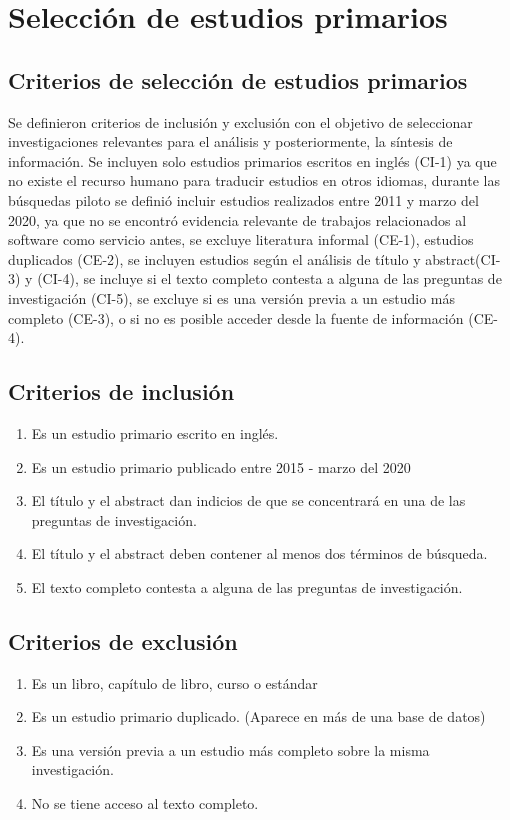 \documentclass{article}
\begin{document}
\section{Selección de estudios primarios}



\subsection{Criterios de selección de estudios primarios}
Se definieron criterios de inclusión y exclusión con el objetivo 
de seleccionar investigaciones relevantes para el análisis y posteriormente, 
la síntesis de información.
Se incluyen solo estudios primarios escritos en inglés (CI-1) ya que no existe el
recurso humano para traducir estudios en otros idiomas, durante las búsquedas piloto 
se definió incluir estudios realizados entre 2011 y marzo del 2020, ya que no se encontró evidencia 
relevante de trabajos relacionados al software como servicio antes, se excluye literatura informal (CE-1),
estudios duplicados (CE-2), se incluyen estudios según el análisis de título y abstract(CI-3) y (CI-4),
se incluye si el texto completo contesta a alguna de las preguntas de investigación (CI-5), 
se excluye si es una versión previa a un estudio más completo (CE-3), o si no es posible acceder desde la fuente 
de información (CE-4).


\subsection{Criterios de inclusión}
\begin{enumerate}[C-1.-]
  \item{Es un estudio primario escrito en inglés.}
  \item{Es un estudio primario publicado entre 2015 - marzo del 2020}
  \item{El título y el abstract dan indicios de que se concentrará en una de las preguntas de investigación.}
  \item{El título y el abstract deben contener al menos dos términos de búsqueda.}
  \item{El texto completo contesta a alguna de las preguntas de investigación.}
\end{enumerate}

\subsection{Criterios de exclusión}
\begin{enumerate}[CE-1.-]
  \item{Es un libro, capítulo de libro, curso o estándar}
  \item{Es un estudio primario duplicado. (Aparece en más de una base de datos)}
  \item{Es una versión previa a un estudio más completo sobre la misma investigación.}
  \item{No se tiene acceso al texto completo.}
\end{enumerate}
\newpage
\end{document}

